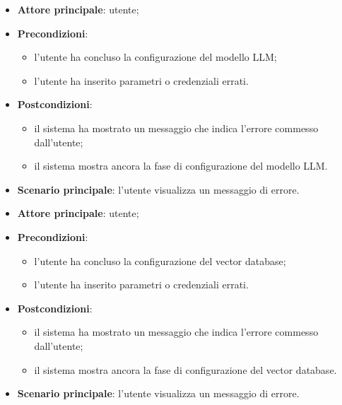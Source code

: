 \documentclass[10pt, a4paper]{article}
\begin{document}
    \begin{itemize}
        \item \textbf{Attore principale}: utente;
        \item \textbf{Precondizioni}: 
            \begin{itemize}
                \item l’utente ha concluso la configurazione del modello LLM;
                \item l’utente ha inserito parametri o credenziali errati.
            \end{itemize}
        \item \textbf{Postcondizioni}: 
            \begin{itemize}
                \item il sistema ha mostrato un messaggio che indica l’errore commesso dall’utente;
                \item il sistema mostra ancora la fase di configurazione del modello LLM.
            \end{itemize}
        \item \textbf{Scenario principale}: l’utente visualizza un messaggio di errore.
    \end{itemize}

    \begin{itemize}
        \item \textbf{Attore principale}: utente;
        \item \textbf{Precondizioni}: 
            \begin{itemize}
                \item l’utente ha concluso la configurazione del vector database;
                \item l’utente ha inserito parametri o credenziali errati.
            \end{itemize}
        \item \textbf{Postcondizioni}: 
            \begin{itemize}
                \item il sistema ha mostrato un messaggio che indica l’errore commesso dall’utente;
                \item il sistema mostra ancora la fase di configurazione del vector database.
            \end{itemize}
        \item \textbf{Scenario principale}: l’utente visualizza un messaggio di errore.
    \end{itemize}
\end{document}
